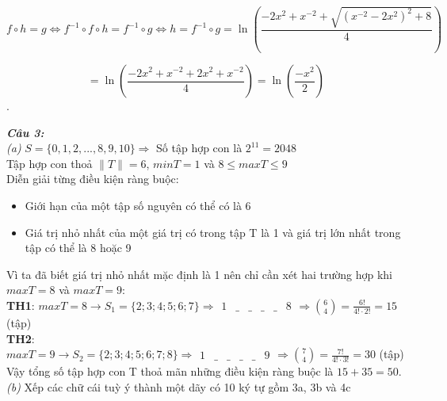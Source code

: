 \documentclass[a4paper]{exam}
\begin{document}
	$$f \circ h = g \Longleftrightarrow f^{-1} \circ f \circ h = f^{-1} \circ g \Longleftrightarrow h = f^{-1} \circ g = \ln \left( \frac{-2x^{2} + x^{-2} + \sqrt{(x^{-2} - 2x^2)^2 + 8}}{4} \right) $$	
	
	$$ = \ln \left( \frac{-2x^2 + x^{-2} + 2x^{2} + x^{-2}}{4} \right) = \ln \left( \frac{-x^{2}}{2} \right)$$.
	
	\textit{\textbf{Câu 3:}}\\
	
	\textit{(a)} $S = \{ 0, 1, 2, ..., 8, 9, 10\} \Longrightarrow$ Số tập hợp con là $2^{11} = 2048$\\
	
	Tập hợp con thoả $\|T\| = 6$, $minT = 1$ và $8 \leq maxT \leq 9$\\
	
	Diễn giải từng điều kiện ràng buộc: 
	
	\begin{itemize}
		\item Giới hạn của một tập số nguyên có thể có là 6
		\item Giá trị nhỏ nhất của một giá trị có trong tập T là 1 và giá trị lớn nhất trong tập có thể là 8 hoặc 9
	\end{itemize}
	
	Vì ta đã biết giá trị nhỏ nhất mặc định là 1 nên chỉ cần xét hai trường hợp khi $maxT = 8$ và $maxT = 9$:\\

		\textbf{TH1}: $maxT = 8 \longrightarrow S_{1} = \{2; 3; 4; 5; 6; 7\} \Longrightarrow 
			\begin{array}{|c|c|c|c|c|c|}
				1 & \_ & \_ & \_ & \_ & 8
			\end{array} \Longrightarrow \binom{6}{4} = \frac{6!}{4! \cdot 2!} = 15$ (tập)\\
			
		\textbf{TH2}: $maxT = 9 \longrightarrow S_{2} = \{2; 3; 4; 5; 6; 7; 8\} \Longrightarrow 
			\begin{array}{|c|c|c|c|c|c|}
				1 & \_ & \_ & \_ & \_ & 9
			\end{array} \Longrightarrow \binom{7}{4} = \frac{7!}{4! \cdot 3!} = 30$ (tập)\\
	
	Vậy tổng số tập hợp con T thoả mãn những điều kiện ràng buộc là $15 + 35 = 50$.\\
	
	\textit{(b)} Xếp các chữ cái tuỳ ý thành một dãy có 10 ký tự gồm 3a, 3b và 4c\\
	
\end{document}
